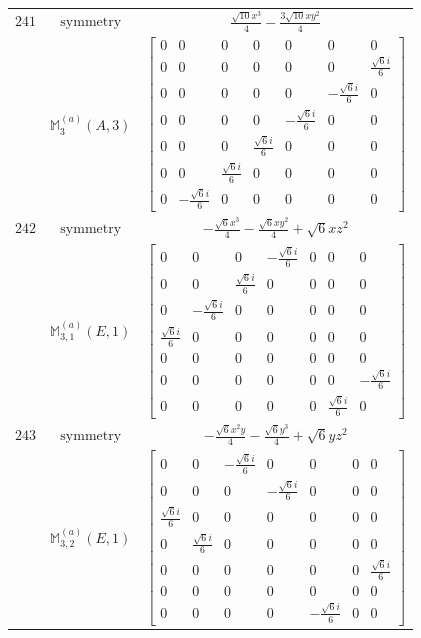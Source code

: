 \documentclass[fleqn,8pt,landscape]{jsarticle}
\begin{document}
\begin{longtable}{ccc}
$ 241 $ & $ \text{symmetry} $ & $ \frac{\sqrt{10} x^{3}}{4} - \frac{3 \sqrt{10} x y^{2}}{4} $ \\
$  $ & $ \mathbb{M}_{3}^{(a)}(A,3) $ & $ \begin{bmatrix} 0 & 0 & 0 & 0 & 0 & 0 & 0 \\ 0 & 0 & 0 & 0 & 0 & 0 & \frac{\sqrt{6} i}{6} \\ 0 & 0 & 0 & 0 & 0 & - \frac{\sqrt{6} i}{6} & 0 \\ 0 & 0 & 0 & 0 & - \frac{\sqrt{6} i}{6} & 0 & 0 \\ 0 & 0 & 0 & \frac{\sqrt{6} i}{6} & 0 & 0 & 0 \\ 0 & 0 & \frac{\sqrt{6} i}{6} & 0 & 0 & 0 & 0 \\ 0 & - \frac{\sqrt{6} i}{6} & 0 & 0 & 0 & 0 & 0 \end{bmatrix} $ \\ \hline
$ 242 $ & $ \text{symmetry} $ & $ - \frac{\sqrt{6} x^{3}}{4} - \frac{\sqrt{6} x y^{2}}{4} + \sqrt{6} x z^{2} $ \\
$  $ & $ \mathbb{M}_{3,1}^{(a)}(E,1) $ & $ \begin{bmatrix} 0 & 0 & 0 & - \frac{\sqrt{6} i}{6} & 0 & 0 & 0 \\ 0 & 0 & \frac{\sqrt{6} i}{6} & 0 & 0 & 0 & 0 \\ 0 & - \frac{\sqrt{6} i}{6} & 0 & 0 & 0 & 0 & 0 \\ \frac{\sqrt{6} i}{6} & 0 & 0 & 0 & 0 & 0 & 0 \\ 0 & 0 & 0 & 0 & 0 & 0 & 0 \\ 0 & 0 & 0 & 0 & 0 & 0 & - \frac{\sqrt{6} i}{6} \\ 0 & 0 & 0 & 0 & 0 & \frac{\sqrt{6} i}{6} & 0 \end{bmatrix} $ \\ \hline
$ 243 $ & $ \text{symmetry} $ & $ - \frac{\sqrt{6} x^{2} y}{4} - \frac{\sqrt{6} y^{3}}{4} + \sqrt{6} y z^{2} $ \\
$  $ & $ \mathbb{M}_{3,2}^{(a)}(E,1) $ & $ \begin{bmatrix} 0 & 0 & - \frac{\sqrt{6} i}{6} & 0 & 0 & 0 & 0 \\ 0 & 0 & 0 & - \frac{\sqrt{6} i}{6} & 0 & 0 & 0 \\ \frac{\sqrt{6} i}{6} & 0 & 0 & 0 & 0 & 0 & 0 \\ 0 & \frac{\sqrt{6} i}{6} & 0 & 0 & 0 & 0 & 0 \\ 0 & 0 & 0 & 0 & 0 & 0 & \frac{\sqrt{6} i}{6} \\ 0 & 0 & 0 & 0 & 0 & 0 & 0 \\ 0 & 0 & 0 & 0 & - \frac{\sqrt{6} i}{6} & 0 & 0 \end{bmatrix} $ \\ \hline

\end{longtable}
\end{document}

